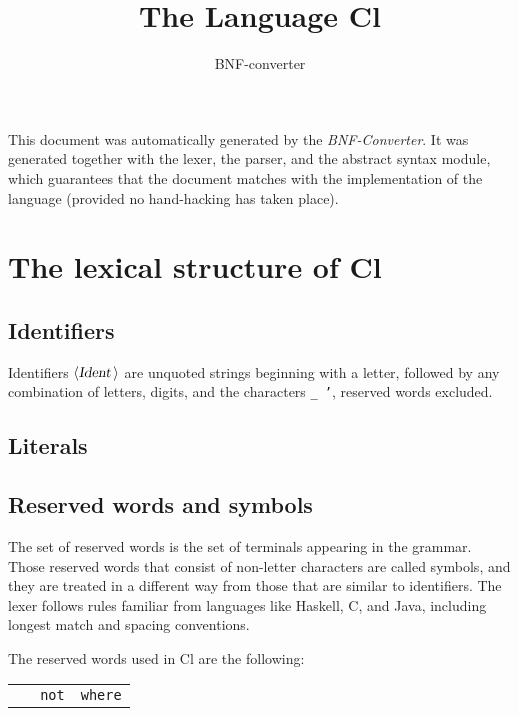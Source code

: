 \documentclass[a4paper,11pt]{article}
\author{BNF-converter}
\title{The Language Cl}
\begin{document}
\maketitle

\newcommand{\emptyP}{\mbox{$\epsilon$}}
\newcommand{\terminal}[1]{\mbox{{\texttt {#1}}}}
\newcommand{\nonterminal}[1]{\mbox{$\langle \mbox{{\sl #1 }} \! \rangle$}}
\newcommand{\arrow}{\mbox{::=}}
\newcommand{\delimit}{\mbox{$|$}}
\newcommand{\reserved}[1]{\mbox{{\texttt {#1}}}}
\newcommand{\literal}[1]{\mbox{{\texttt {#1}}}}
\newcommand{\symb}[1]{\mbox{{\texttt {#1}}}}

This document was automatically generated by the {\em BNF-Converter}. It was generated together with the lexer, the parser, and the abstract syntax module, which guarantees that the document matches with the implementation of the language (provided no hand-hacking has taken place).

\section*{The lexical structure of Cl}
\subsection*{Identifiers}
Identifiers \nonterminal{Ident} are unquoted strings beginning with a letter,
followed by any combination of letters, digits, and the characters {\tt \_ '},
reserved words excluded.


\subsection*{Literals}


\subsection*{Reserved words and symbols}
The set of reserved words is the set of terminals appearing in the grammar. Those reserved words that consist of non-letter characters are called symbols, and they are treated in a different way from those that are similar to identifiers. The lexer follows rules familiar from languages like Haskell, C, and Java, including longest match and spacing conventions.

The reserved words used in Cl are the following: \\

\begin{tabular}{lll}
{\reserved{
}} &{\reserved{not}} &{\reserved{where}} \\
\end{tabular}\\
\end{document}
